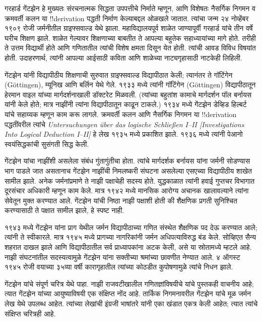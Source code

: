 \documentclass[../../../include/open-logic-section]{subfiles}
\begin{document}



गरहार्ड गेंटझेन हे मुख्यतः संरचनात्मक सिद्धता उपपत्तीचे निर्माते म्हणून, आणि विशेषतः नैसर्गिक निगमन व क्रमवर्ती कलन या !!{derivation} पद्धती निर्माण केल्याबद्दल ओळखले जातात. त्यांचा जन्म २४ नोव्हेंबर १९०९ रोजी जर्मनीतील ग्राइफ्सवाल्ड येथे झाला. महाविद्यालयपूर्व शाळेत जाण्यापूर्वी गरहार्ड यांचे तीन वर्षे घरीच शिक्षण झाले. शाळेत गेल्यावर शिक्षणाच्या बाबतीत ते आपल्या बहुतेक सहाध्यायांच्या मागे होते. तरीही ते उत्तम विद्यार्थी होते आणि गणितातील त्यांची विशेष क्षमता दिसून येत होती. त्यांची आवड विविध विषयांत होती. उदाहरणार्थ, त्यांनी आपल्या आईसाठी कविता आणि शाळेच्या नाट्यगृहासाठी नाटकेही लिहिली.

गेंटझेन यांनी विद्यापीठीय शिक्षणाची सुरुवात ग्राइफ्सवाल्ड विद्यापीठात केली; त्यानंतर ते गॉटिंगेन (G\"{o}ttingen), म्यूनिख आणि बर्लिन येथे गेले. १९३३ मध्ये त्यांनी गॉटिंगेन (G\"{o}ttingen) विद्यापीठातून हेरमान वाइल यांच्या मार्गदर्शनाखाली डॉक्टरेट मिळवली. (त्यांच्या बहुतांश कामाचे मार्गदर्शन पॉल बर्नायस यांनी केले होते; मात्र नाझींनी त्यांना विद्यापीठातून काढून टाकले.) १९३४ मध्ये गेंटझेन डेव्हिड हिल्बर्ट यांचे सहाय्यक म्हणून काम करू लागले. क्रमवर्ती कलन आणि नैसर्गिक निगमन या !!{derivation} पद्धतींवरील त्यांचे \emph{Untersuchungen \"{u}ber das logische Schlie\ss en I--II
  [Investigations Into Logical Deduction I--II]} हे लेख १९३५ मध्ये प्रकाशित झाले. १९३६ मध्ये त्यांनी पेआनो स्वयंसिद्धकांची सुसंगती सिद्ध केली.

गेंटझेन यांचा नाझींशी असलेला संबंध गुंतागुंतीचा होता. त्यांचे मार्गदर्शक बर्नायस यांना जर्मनी सोडण्यास भाग पाडले जात असतानाच गेंटझेन नाझींची निमलष्करी संघटना असलेल्या एसएच्या विद्यापीठीय शाखेत सामील झाले. अनेक जर्मनांप्रमाणे ते नाझी पक्षाचेही सदस्य होते. युद्धकाळात त्यांनी हवाई गुप्तचर विभागात दूरसंचार अधिकारी म्हणून काम केले. मात्र १९४२ मध्ये मानसिक आरोग्य अचानक खालावल्याने त्यांना सेवेतून मुक्त करण्यात आले. गेंटझेन यांची निष्ठा नाझी पक्षाशी होती की शैक्षणिक प्रगती सुनिश्चित करण्यासाठी ते पक्षात सामील झाले, हे स्पष्ट नाही.

१९४३ मध्ये गेंटझेन यांना प्राग येथील जर्मन विद्यापीठाच्या गणित संस्थेत शैक्षणिक पद देऊ करण्यात आले; त्यांनी ते स्वीकारले. मात्र १९४५ मध्ये प्रागच्या नागरिकांनी जर्मन अधिपत्याविरुद्ध बंड केले. सोव्हिएत सैन्य शहरात दाखल झाले आणि विद्यापीठातील सर्व प्राध्यापकांना अटक केली, असे या स्रोतामध्ये म्हटले आहे. नाझी संघटनांतील सदस्यत्वामुळे गेंटझेन यांना सक्तीच्या श्रमांच्या छावणीत नेण्यात आले. ४ ऑगस्ट १९४५ रोजी वयाच्या ३५व्या वर्षी कारागृहातील त्यांच्या कोठडीत कुपोषणामुळे त्यांचे निधन झाले.

\begin{reading}
गेंटझेन यांचे संपूर्ण चरित्र \citet{Menzler-Trott2007} येथे पाहा. नाझी राजवटीखालील गणितज्ञांविषयीचे \citet{Segal2014} यांचे पुस्तकही वाचनीय आहे; त्यात गेंटझेन यांच्या आयुष्याविषयी एक संक्षिप्त नोंद आहे. तार्किक निगमनावरील गेंटझेन यांचे मूळ जर्मन लेख \citep{Gentzen1935a,Gentzen1935b} येथे उपलब्ध आहेत. त्यांच्या लेखांची इंग्रजी भाषांतरे \citet{Gentzen1969} यांनी एका खंडात एकत्र केली आहेत; त्यात त्यांचे संक्षिप्त चरित्रही आहे.
\end{reading}
\end{document}
